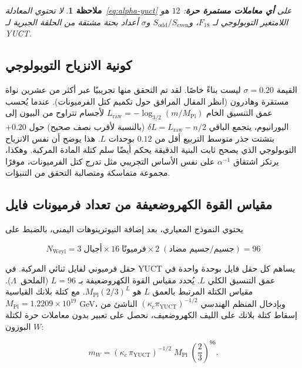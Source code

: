 \documentclass[11pt,a4paper]{article}
\newtheorem{remark}{ملاحظة}
\begin{document}
	\begin{remark}
		لا تحتوي المعادلة~\eqref{eq:alpha-yuct} على \textbf{أي معاملات مستمرة حرة}: \(12\) هو اللامتغير التوبولوجي لـ \(F_{18}\)، و\(S_{\mathrm{odd}}/S_{\mathrm{even}}\) و\(\sigma\) أعداد بحتة مشتقة من الحلقة الجبرية لـ YUCT.
	\end{remark}
	
	\subsection{كونية الانزياح التوبولوجي}
	
	القيمة \(\sigma = 0.20\) ليست بناءً خاصًا. لقد تم التحقق منها تجريبيًا عبر أكثر من عشرين نواة مستقرة وهادرون (انظر المقال المرافق حول تكميم كتل الفرميونات). عندما يُحسب عمق التنسيق الخام \(L_{\mathrm{raw}} = -\log_{3/2}(m/M_{\mathrm{Pl}})\) لأجسام تتراوح من البيون إلى اليورانيوم، يتجمع الباقي \(\delta L = L_{\mathrm{raw}} - n/2\) (بالنسبة لأقرب نصف صحيح) حول \(+0.20\) بتشتت جذر متوسط التربيع أقل من \(0.12\) بوحدات \(L\). هذا يوضح أن نفس الانزياح التوبولوجي الذي يصحح ثابت البنية الدقيقة يحكم أيضًا سلم كتلة المادة المركبة. وهكذا، يرتكز اشتقاق \(\alpha^{-1}\) على نفس الأساس التجريبي مثل تدرج كتل الفرميونات، موفرًا مجموعة متماسكة ومتصالبة التحقق من التنبؤات.
	
	\subsection{مقياس القوة الكهروضعيفة من تعداد فرميونات فايل}
	
	يحتوي النموذج المعياري، بعد إضافة النيوترينوهات اليمنى، بالضبط على
	
	\begin{equation}
		N_{\mathrm{Weyl}} = 3\;\text{أجيال} \times 16\;\text{فرميونًا}
		\times 2\;(\text{جسيم/جسيم مضاد}) = 96
	\end{equation}
	
	حقل فرميوني لفايل ثنائي المركبة. في YUCT يساهم كل حقل فايل بوحدة واحدة في عمق التنسيق الكلي \(L\). يُحدد مقياس القوة الكهروضعيفة بـ \(L = 96\) (الملحق~\(\Lambda\)). مقياس الكتلة المرتبط بالعمق \(L\) هو \(M_{\mathrm{Pl}} (2/3)^{L}\). مع كتلة بلانك القياسية \(M_{\mathrm{Pl}} = 1.2209 \times 10^{19}\) GeV، وبإدخال المنظم الهندسي \((\kappa_c \pi_{\mathrm{YUCT}})^{-1/2}\) الناشئ من إسقاط كتلة بلانك على الليف الكهروضعيف، نحصل على تعبير بدون معاملات حرة لكتلة البوزون \(W\):
	
	\begin{equation}
		\boxed{m_W = \left( \kappa_c \, \pi_{\mathrm{YUCT}} \right)^{-1/2}
			\; M_{\mathrm{Pl}} \; \left( \frac{2}{3} \right)^{96}}.
		\label{eq:mw-corrected}
	\end{equation}
	
\end{document}
